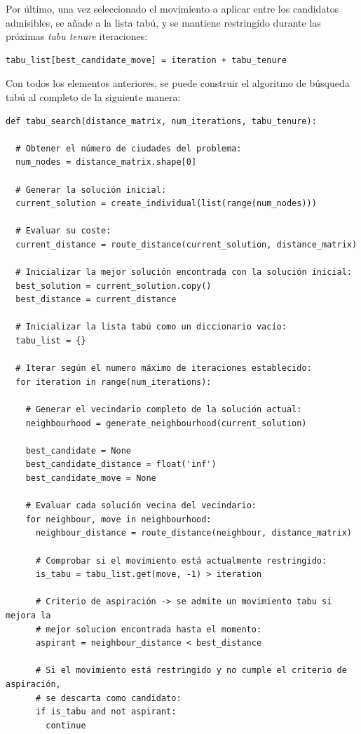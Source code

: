 Por último, una vez seleccionado el movimiento a aplicar entre los candidatos admisibles, se añade a la lista tabú, y se
mantiene restringido durante las próximas \textit{tabu tenure} iteraciones:
\newline
\begin{lstlisting}[style=PythonStyle]
  tabu_list[best_candidate_move] = iteration + tabu_tenure
\end{lstlisting}

Con todos los elementos anteriores, se puede construir el algoritmo de búsqueda tabú al completo de la siguiente manera:
\newline
\begin{lstlisting}[style=PythonStyle]
def tabu_search(distance_matrix, num_iterations, tabu_tenure):

  # Obtener el número de ciudades del problema:
  num_nodes = distance_matrix.shape[0]

  # Generar la solución inicial:
  current_solution = create_individual(list(range(num_nodes)))

  # Evaluar su coste:
  current_distance = route_distance(current_solution, distance_matrix)

  # Inicializar la mejor solución encontrada con la solución inicial:
  best_solution = current_solution.copy()
  best_distance = current_distance

  # Inicializar la lista tabú como un diccionario vacío:
  tabu_list = {}

  # Iterar según el numero máximo de iteraciones establecido:
  for iteration in range(num_iterations):

    # Generar el vecindario completo de la solución actual:
    neighbourhood = generate_neighbourhood(current_solution)

    best_candidate = None
    best_candidate_distance = float('inf')
    best_candidate_move = None

    # Evaluar cada solución vecina del vecindario:
    for neighbour, move in neighbourhood:
      neighbour_distance = route_distance(neighbour, distance_matrix)

      # Comprobar si el movimiento está actualmente restringido:
      is_tabu = tabu_list.get(move, -1) > iteration

      # Criterio de aspiración -> se admite un movimiento tabu si mejora la
      # mejor solucion encontrada hasta el momento:
      aspirant = neighbour_distance < best_distance

      # Si el movimiento está restringido y no cumple el criterio de aspiración,
      # se descarta como candidato:
      if is_tabu and not aspirant:
        continue


\end{lstlisting}
